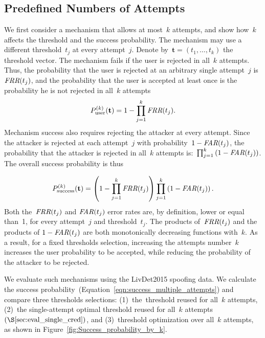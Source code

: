 \documentclass[conference,compsoc]{IEEEtran}
\begin{document}
\subsection{Predefined Numbers of Attempts}\label{sec:equal_k_attempts}
\noindent
We first consider a mechanism that allows at most~$k$ attempts, and show how~$k$ affects the threshold and the success probability. The mechanism may use a different threshold~$t_j$ at every attempt~$j$. Denote by~$\mathbf{t}=(t_1,\ldots,t_k)$ the threshold vector. The mechanism fails if the user is rejected in all~$k$ attempts. Thus, the probability that the user is rejected at an arbitrary single attempt~$j$ is~$\textit{FRR}(t_j)$, and the probability that the user is accepted at least once is the probability he is not rejected in all~$k$ attempts
\begin{equation}\label{eq:user_auth_in_k}
    P_{\mathrm{user}}^{(k)}(\mathbf{t})=1-\prod_{j=1}^{k}\textit{FRR}(t_j).
\end{equation}
Mechanism success also requires rejecting the attacker at every attempt. Since the attacker is rejected at each attempt~$j$ with probability~$1-\textit{FAR}(t_j)$, the probability that the attacker is rejected in all~$k$ attempts is:~$\prod_{j=1}^{k}\left(1-\textit{FAR}(t_j)\right)$. The overall success probability is thus

\begin{equation}\label{eqn:success_multiple_attempts}
P_{\mathrm{success}}^{(k)}(\mathbf{t})
=
\left(
1-
\prod_{j=1}^{k}\textit{FRR}(t_j)
\right)
\prod_{j=1}^{k}
\left(1-\textit{FAR}(t_j)\right).
\end{equation}
Both the~$\textit{FRR}(t_j)$ and $\textit{FAR}(t_j)$ error rates are, by definition, lower or equal than~1, for every attempt~$j$ and threshold~$t_j$. The products of~$\textit{FRR}(t_j)$ and the products of $1-\textit{FAR}(t_j)$ are both monotonically decreasing functions with~$k$. As a result, for a fixed thresholds selection, increasing the attempts number~$k$ increases the user probability to be accepted, while reducing the probability of the attacker to be rejected.

We evaluate such mechanisms using the LivDet2015 spoofing data.
We calculate the success probability~(Equation~\ref{eqn:success_multiple_attempts}) and compare three thresholds selections: (1)~the~\EER threshold reused for all~$k$ attempts, (2)~the single-attempt optimal threshold reused for all~$k$ attempts~$(\S\ref{sec:eval_single_cred})$, and (3)~threshold optimization over all~$k$ attempts, as shown in Figure~\ref{fig:Success_probability_by_k}. 
\end{document}
